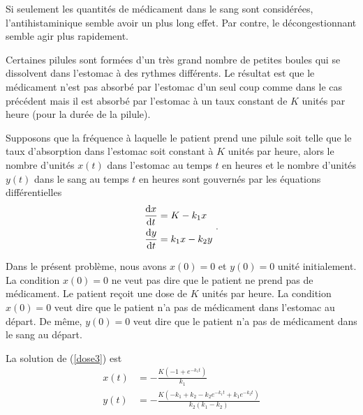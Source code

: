 {\begin{egg}


Si seulement les quantités de médicament dans le sang sont considérées,
l'antihistaminique semble avoir un plus long effet.  Par contre, le
décongestionnant semble agir plus rapidement.


Certaines pilules sont formées d'un très grand nombre de petites boules qui se
dissolvent dans l'estomac à des rythmes différents.  Le résultat est que le
médicament n'est pas absorbé par l'estomac d'un seul coup comme dans le cas
précédent mais il est absorbé par l'estomac à un taux constant de $K$
unités par heure (pour la durée de la pilule).

Supposons que la fréquence à laquelle le patient prend une pilule soit
telle que le taux d'absorption dans l'estomac soit constant à $K$ unités par
heure, alors le nombre d'unités $x(t)$ dans l'estomac au temps $t$ en heures
et le nombre d'unités $y(t)$ dans le sang au temps $t$ en heures sont
gouvernés par les équations différentielles
\begin{equation} \label{dose3}
\begin{split}
\frac{\mathrm{d}x}{\mathrm{d}t} &= K -k_1 x \\
\frac{\mathrm{d}y}{\mathrm{d}t} &= k_1 x - k_2 y
\end{split} \ .
\end{equation}

Dans le présent problème, nous avons $x(0)=0$ et $y(0)=0$ unité
initialement.  La condition $x(0)=0$ ne veut pas dire que le patient
ne prend pas de médicament.  Le patient reçoit une dose de $K$ unités par
heure.  La condition $x(0)=0$ veut dire que le patient n'a pas de
médicament dans l'estomac au départ.  De même, $y(0)=0$ veut dire que
le patient n'a pas de médicament dans le sang au départ.

La solution de (\ref{dose3}) est
\begin{align*}
x(t) &= -\frac{K\left(-1 + e^{-k_1 t}\right)}{k_1} \\
y(t) &= -\frac{K\left(-k_1 + k_2 - k_2 e^{-k_1 t} + k_1 e^{-k_2
      t}\right)}{k_2 (k_1 - k_2)}
\end{align*}


\end{egg}}
